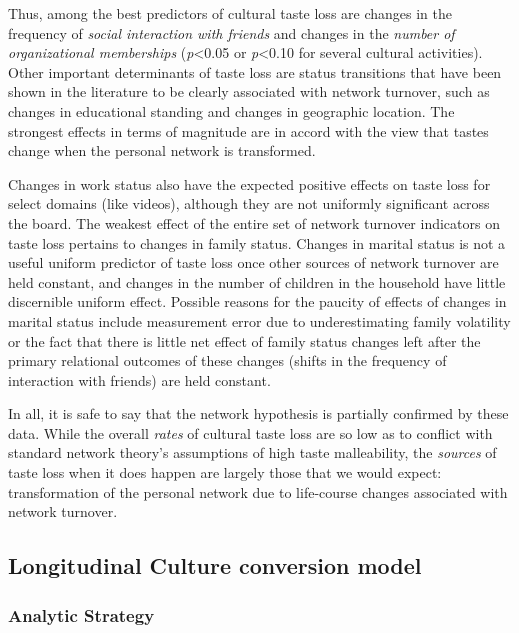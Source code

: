 \documentclass[
]{article}
\begin{document}
Thus, among the best predictors of cultural taste loss are changes in the frequency of \emph{social interaction with friends} and changes in the \emph{number of organizational memberships} (\emph{p}\textless0.05 or \emph{p}\textless0.10 for several cultural activities). Other important determinants of taste loss are status transitions that have been shown in the literature to be clearly associated with network turnover, such as changes in educational standing and changes in geographic location. The strongest effects in terms of magnitude are in accord with the view that tastes change when the personal network is transformed.

Changes in work status also have the expected positive effects on taste loss for select domains (like videos), although they are not uniformly significant across the board. The weakest effect of the entire set of network turnover indicators on taste loss pertains to changes in family status. Changes in marital status is not a useful uniform predictor of taste loss once other sources of network turnover are held constant, and changes in the number of children in the household have little discernible uniform effect. Possible reasons for the paucity of effects of changes in marital status include measurement error due to underestimating family volatility or the fact that there is little net effect of family status changes left after the primary relational outcomes of these changes (shifts in the frequency of interaction with friends) are held constant.

In all, it is safe to say that the network hypothesis is partially confirmed by these data. While the overall \emph{rates} of cultural taste loss are so low as to conflict with standard network theory's assumptions of high taste malleability, the \emph{sources} of taste loss when it does happen are largely those that we would expect: transformation of the personal network due to life-course changes associated with network turnover.



\subsection{Longitudinal Culture conversion model}\label{longitudinal-culture-conversion-model}

\subsubsection{Analytic Strategy}\label{analytic-strategy-1}
\end{document}
